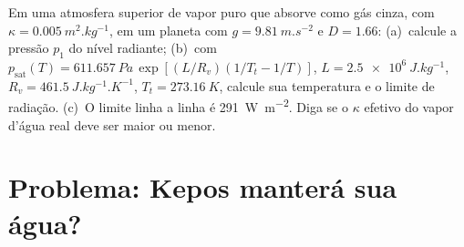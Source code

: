 \begin{exercise}[$\star\star\star$]\label{exo:b3:planetary-atmospheres:12}
Em uma atmosfera superior de vapor puro que absorve como gás cinza, com $\kappa =
\qty{0.005}{m^2.kg^{-1}}$, em um planeta com $g = \qty{9.81}{m.s^{-2}}$
e $D = 1.66$: (a)~calcule a pressão $p_1$ do nível radiante;
(b)~com $p_\mathrm{sat}(T) = \qty{611.657}{Pa}\,\exp[(L/R_v)(1/T_t -
1/T)]$, $L = \qty{2.5e6}{J.kg^{-1}}$, $R_v = \qty{461.5}{J.kg^{-1}.K^{-1}}$,
$T_t = \qty{273.16}{K}$, calcule sua temperatura e o limite de radiação.
(c)~O limite linha a linha é \qty{291}{W.m^{-2}}. Diga se o $\kappa$ efetivo
do vapor d'água real deve ser maior ou menor.
\end{exercise}

\section{Problema: Kepos manterá sua água?}

